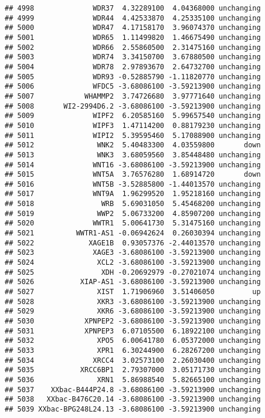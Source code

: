 \documentclass[]{article}
\begin{document}
\begin{verbatim}
## 4998              WDR37  4.32289100  4.04368000 unchanging
## 4999              WDR44  4.42533870  4.25335100 unchanging
## 5000              WDR47  4.17158170  3.96074370 unchanging
## 5001              WDR65  1.11499820  1.46675490 unchanging
## 5002              WDR66  2.55860500  2.31475160 unchanging
## 5003              WDR74  3.34150700  3.67880500 unchanging
## 5004              WDR78  2.97893670  2.64732700 unchanging
## 5005              WDR93 -0.52885790 -1.11820770 unchanging
## 5006              WFDC5 -3.68086100 -3.59213900 unchanging
## 5007            WHAMMP2  3.74726680  3.97771640 unchanging
## 5008       WI2-2994D6.2 -3.68086100 -3.59213900 unchanging
## 5009              WIPF2  6.20585160  5.99657540 unchanging
## 5010              WIPF3  1.47114200  0.88179230 unchanging
## 5011              WIPI2  5.39595460  5.17088900 unchanging
## 5012               WNK2  5.40483300  4.03559800       down
## 5013               WNK3  3.68059560  3.85448480 unchanging
## 5014              WNT16 -3.68086100 -3.59213900 unchanging
## 5015              WNT5A  3.76576280  1.68914720       down
## 5016              WNT5B -3.52885800 -1.44013570 unchanging
## 5017              WNT9A  1.96299520  1.95218160 unchanging
## 5018                WRB  5.69031050  5.45468200 unchanging
## 5019               WWP2  5.06733200  4.85907200 unchanging
## 5020              WWTR1  5.00641730  5.31475160 unchanging
## 5021          WWTR1-AS1 -0.06942624  0.26030394 unchanging
## 5022             XAGE1B  0.93057376 -2.44013570 unchanging
## 5023              XAGE3 -3.68086100 -3.59213900 unchanging
## 5024               XCL2 -3.68086100 -3.59213900 unchanging
## 5025                XDH -0.20692979 -0.27021074 unchanging
## 5026           XIAP-AS1 -3.68086100 -3.59213900 unchanging
## 5027               XIST  1.71906960  3.51406050         up
## 5028               XKR3 -3.68086100 -3.59213900 unchanging
## 5029               XKR6 -3.68086100 -3.59213900 unchanging
## 5030            XPNPEP2 -3.68086100 -3.59213900 unchanging
## 5031            XPNPEP3  6.07105500  6.18922100 unchanging
## 5032               XPO5  6.00641780  6.05372000 unchanging
## 5033               XPR1  6.30244900  6.28267200 unchanging
## 5034              XRCC4  3.02573100  2.26030400 unchanging
## 5035           XRCC6BP1  2.79307000  3.05171730 unchanging
## 5036               XRN1  5.86988540  5.82665100 unchanging
## 5037    XXbac-B444P24.8 -3.68086100 -3.59213900 unchanging
## 5038   XXbac-B476C20.14 -3.68086100 -3.59213900 unchanging
## 5039 XXbac-BPG248L24.13 -3.68086100 -3.59213900 unchanging

\end{verbatim}
\end{document}

